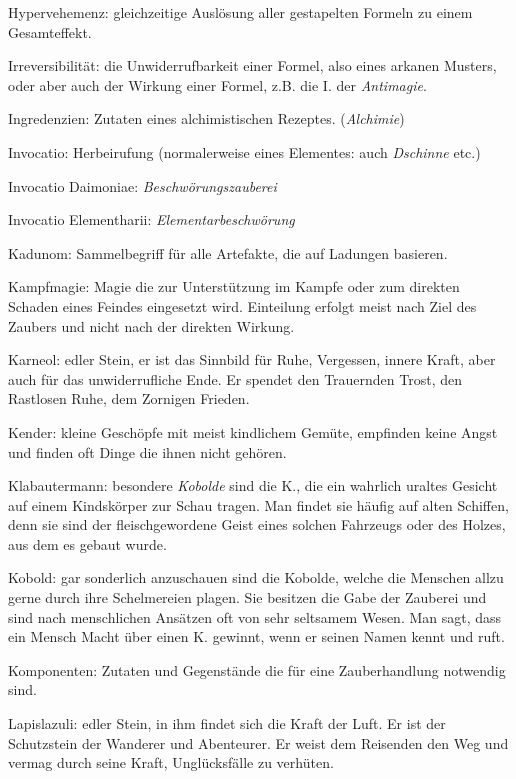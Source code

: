 \documentclass[a5paper,8pt]{book}
\begin{document}
\begin{small}
\begin{description}
 \item Hypervehemenz: gleichzeitige Auslösung aller gestapelten Formeln zu einem Gesamteffekt.
 \item Irreversibilität: die Unwiderrufbarkeit einer Formel, also eines arkanen Musters, oder aber auch der Wirkung einer Formel, z.B. die I. der \textit{Antimagie}.
 \item Ingredenzien: Zutaten eines alchimistischen Rezeptes. (\textit{Alchimie})
 \item Invocatio: Herbeirufung (normalerweise eines Elementes: auch \textit{Dschinne} etc.)
 \item Invocatio Daimoniae: \textit{Beschwörungszauberei}
 \item Invocatio Elementharii: \textit{Elementarbeschwörung}
 \item Kadunom: Sammelbegriff für alle Artefakte, die auf Ladungen basieren.
 \item Kampfmagie: Magie die zur Unterstützung im Kampfe oder zum direkten Schaden eines Feindes eingesetzt wird. Einteilung erfolgt meist nach Ziel des Zaubers und 
nicht nach der direkten Wirkung.
 \item Karneol: edler Stein, er ist das Sinn­bild für Ruhe, Vergessen, innere Kraft, aber auch für das unwiderrufliche Ende. Er spendet den Trauernden Trost, den Rastlosen
Ruhe, dem Zornigen Frieden.
 \item Kender: kleine Geschöpfe mit meist kindlichem Gemüte, empfinden keine Angst und finden oft Dinge die ihnen nicht gehören.
 \item Klabautermann: besondere \textit{Kobolde} sind die K., die ein wahrlich uraltes Gesicht auf einem Kindskörper zur Schau tragen. Man findet sie häufig auf alten 
Schiffen, denn sie sind der fleischgewordene Geist eines solchen Fahrzeugs oder des Holzes, aus dem es gebaut wurde.
 \item Kobold: gar sonderlich anzuschauen sind die Kobolde, welche die Menschen allzu gerne durch ihre Schelmereien plagen. Sie besitzen die Gabe der Zauberei und sind 
nach menschlichen Ansätzen oft von sehr seltsamem Wesen. Man sagt, dass ein Mensch Macht über einen K. gewinnt, wenn er seinen Namen kennt und ruft.
 \item Komponenten: Zutaten und Gegenstände die für eine Zauberhandlung notwendig sind.
 \item Lapislazuli: edler Stein, in ihm findet sich die Kraft der Luft. Er ist der Schutzstein der Wanderer und Abenteurer. Er weist dem Reisenden den Weg und vermag 
durch seine Kraft, Unglücksfälle zu verhüten.

\end{description}
\end{small}
\end{document}
